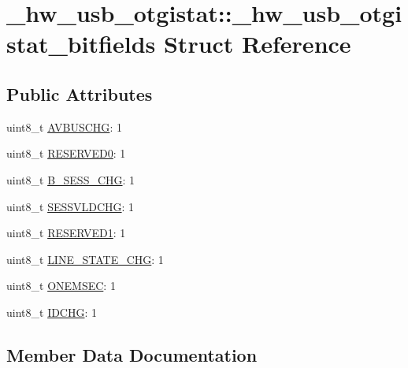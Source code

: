 \hypertarget{struct__hw__usb__otgistat_1_1__hw__usb__otgistat__bitfields}{}\section{\+\_\+hw\+\_\+usb\+\_\+otgistat\+:\+:\+\_\+hw\+\_\+usb\+\_\+otgistat\+\_\+bitfields Struct Reference}
\label{struct__hw__usb__otgistat_1_1__hw__usb__otgistat__bitfields}
\subsection*{Public Attributes}
\begin{DoxyCompactItemize}
\item 
uint8\+\_\+t \hyperlink{struct__hw__usb__otgistat_1_1__hw__usb__otgistat__bitfields_ad18d6cc89dcbc2b93347b82bb9142d06}{A\+V\+B\+U\+S\+C\+HG}\+: 1
\item 
uint8\+\_\+t \hyperlink{struct__hw__usb__otgistat_1_1__hw__usb__otgistat__bitfields_a742b1d004306413cadb7fe33d17eb40a}{R\+E\+S\+E\+R\+V\+E\+D0}\+: 1
\item 
uint8\+\_\+t \hyperlink{struct__hw__usb__otgistat_1_1__hw__usb__otgistat__bitfields_a93e86f39f683ffc142a42a986b40a03c}{B\+\_\+\+S\+E\+S\+S\+\_\+\+C\+HG}\+: 1
\item 
uint8\+\_\+t \hyperlink{struct__hw__usb__otgistat_1_1__hw__usb__otgistat__bitfields_af7bb4d1edc879843caf97420214ece23}{S\+E\+S\+S\+V\+L\+D\+C\+HG}\+: 1
\item 
uint8\+\_\+t \hyperlink{struct__hw__usb__otgistat_1_1__hw__usb__otgistat__bitfields_a5ea328f79cbfb5dd75ac277876d3eaf2}{R\+E\+S\+E\+R\+V\+E\+D1}\+: 1
\item 
uint8\+\_\+t \hyperlink{struct__hw__usb__otgistat_1_1__hw__usb__otgistat__bitfields_a020970538c8be1fb7f5e7d3f2e0a5c9c}{L\+I\+N\+E\+\_\+\+S\+T\+A\+T\+E\+\_\+\+C\+HG}\+: 1
\item 
uint8\+\_\+t \hyperlink{struct__hw__usb__otgistat_1_1__hw__usb__otgistat__bitfields_a84967bfd45dc3211486aca900f656f9e}{O\+N\+E\+M\+S\+EC}\+: 1
\item 
uint8\+\_\+t \hyperlink{struct__hw__usb__otgistat_1_1__hw__usb__otgistat__bitfields_aed069859d5db336b3d67577963a4d627}{I\+D\+C\+HG}\+: 1
\end{DoxyCompactItemize}


\subsection{Member Data Documentation}
